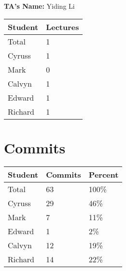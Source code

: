 \documentclass{article}
\begin{document}

\noindent \textbf{TA's Name: } Yiding Li

\begin{table}[H]
\centering
\begin{tabular}{ll}
\toprule
\textbf{Student} & \textbf{Lectures}\\
\midrule
Total & 1\\
Cyruss & 1\\
Mark & 0\\
Calvyn & 1\\
Edward & 1\\
Richard & 1\\
\bottomrule
\end{tabular}
\end{table}


\section{Commits}


\begin{table}[H]
\centering
\begin{tabular}{lll}
\toprule
\textbf{Student} & \textbf{Commits} & \textbf{Percent}\\
\midrule
Total & 63 & 100\% \\
Cyruss & 29 & 46\% \\
Mark & 7 & 11\% \\
Edward & 1 & 2\% \\
Calvyn & 12 & 19\% \\
Richard & 14 & 22\% \\
\bottomrule
\end{tabular}
\end{table}

\end{document}
